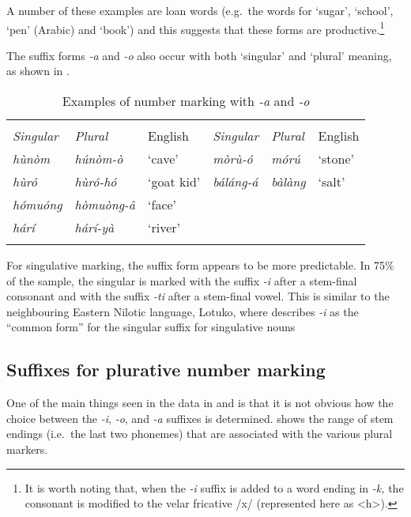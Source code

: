 \documentclass[output=paper]{langsci/langscibook}
\begin{document}
A number of these examples are loan words (e.g.\ the words for ‘sugar’, ‘school’, ‘pen’ (Arabic) and ‘book’) and this suggests that these forms are productive.\footnote{It is worth noting that, when the \textit{-i} suffix is added to a word ending in \textit{-k,} the consonant is modified to the velar fricative /x/ (represented here as <h>).} 
 
The suffix forms \textit{-a }and \textit{-o} also occur with both `singular' and `plural' meaning, as shown in . 

\begin{table}
\begin{tabularx}{\textwidth}{>{\itshape}X>{\itshape}lX>{\itshape}X>{\itshape}XX}
\lsptoprule

\multicolumn{3}{c}{ \textup{Plural}} & \multicolumn{3}{c}{ \textup{Singulative}}\\ \cmidrule(lr){1-3}\cmidrule(lr){4-6}
 \textup{Singular} & \textup{Plural} & {English} & \textup{Singular} & \textup{Plural} & {English}\\ \midrule
 hùnòm &  húnòm-ò & ‘cave’ &  mòrù-ó &  mórú & ‘stone’\\
 hùró &  hùró-hó & ‘goat kid’ &  báláng-á &  bàlàng & ‘salt’\\
 hómuóng &  hòmuòng-\^{a} & ‘face’ &  &  & \\
 hárí &  hárí-yà & ‘river’ &  &  & \\
\lspbottomrule
\end{tabularx}
\caption{Examples of number marking with \textit{-a} and \textit{-o}} 
\label{tab:moodie:11}
\end{table}

For singulative marking, the suffix form appears to be more predictable.  In 75\% of the sample, the singular is marked with the suffix \textit{-i} after a stem-final consonant and with the suffix \textit{-ti} after a stem-final vowel. This is similar to the neighbouring Eastern Nilotic language, Lotuko, where \citet[7]{Arber1936} describes \textit{-i} as the “common form” for the singular suffix for singulative nouns 

\subsection{Suffixes for plurative number marking}\label{sec:moodie:4.2} 

One of the main things seen in the data in  and  is that it is not obvious how the choice between the \textit{-i}, \textit{-o}, and \textit{-a} suffixes is determined.  shows the range of stem endings (i.e.\ the last two phonemes) that are associated with the various plural markers.
\end{document}
